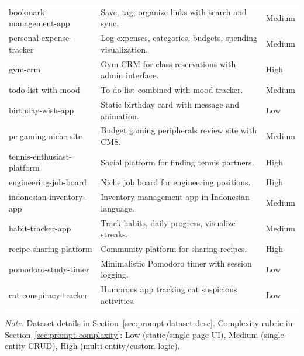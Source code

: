 \documentclass[conference]{IEEEtran}
\begin{document}
\begin{table}[h!]
\begin{tabular}{@{}p{4cm}p{10cm}p{2cm}@{}}
bookmark-management-app & Save, tag, organize links with search and sync. & Medium \\
personal-expense-tracker & Log expenses, categories, budgets, spending visualization. & Medium \\
gym-crm & Gym CRM for class reservations with admin interface. & High \\
todo-list-with-mood & To-do list combined with mood tracker. & Medium \\
birthday-wish-app & Static birthday card with message and animation. & Low \\
pc-gaming-niche-site & Budget gaming peripherals review site with CMS. & Medium \\
tennis-enthusiast-platform & Social platform for finding tennis partners. & High \\
engineering-job-board & Niche job board for engineering positions. & High \\
indonesian-inventory-app & Inventory management app in Indonesian language. & Medium \\
habit-tracker-app & Track habits, daily progress, visualize streaks. & Medium \\
recipe-sharing-platform & Community platform for sharing recipes. & High \\
pomodoro-study-timer & Minimalistic Pomodoro timer with session logging. & Low \\
cat-conspiracy-tracker & Humorous app tracking cat suspicious activities. & Low \\
\bottomrule
\end{tabular}
\vspace{2mm}
\footnotesize
\textit{Note.} Dataset details in Section~\ref{sec:prompt-dataset-desc}. Complexity rubric in Section~\ref{sec:prompt-complexity}: Low (static/single-page UI), Medium (single-entity CRUD), High (multi-entity/custom logic).
\end{table}
\end{document}
